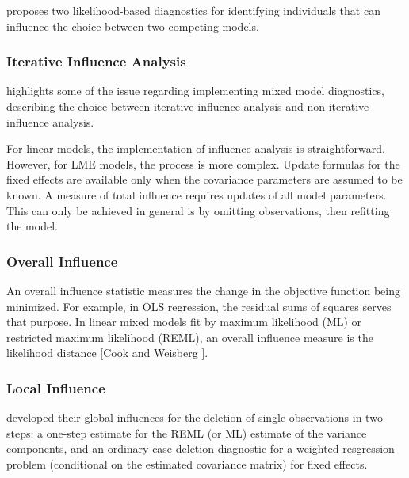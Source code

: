 \documentclass[12pt, a4paper]{report}
\theoremstyle{plain}
\theoremstyle{definition}
\theoremstyle{remark}
\begin{document}
	\citet{Demi} proposes two likelihood-based diagnostics for identifying individuals that can influence the choice between two competing models.
	
	
	
	\subsubsection{Iterative Influence Analysis}
	
	\citet{schabenberger} highlights some of the issue regarding implementing mixed model diagnostics, describing  the choice between  iterative influence analysis and  non-iterative influence analysis.
	
	For linear models, the implementation of influence analysis is straightforward. However, for LME models, the process is more complex. Update formulas for the fixed effects are available only when the covariance parameters are assumed to be known. A measure of total influence requires updates of all model parameters. This can only be achieved in general is by omitting observations, then refitting the model.
	
		\subsubsection{Overall Influence}
		An overall influence statistic measures the change in the objective function being minimized. For example, in
		OLS regression, the residual sums of squares serves that purpose. In linear mixed models fit by
		 maximum likelihood (ML) or  restricted maximum likelihood (REML), an overall influence measure is the  likelihood distance [Cook and Weisberg ].
		
	\subsubsection{Local Influence}

	

	
	\citet{Christensen} developed their global influences for the deletion of single observations in two steps: a one-step estimate for the REML (or ML) estimate of the variance components, and an ordinary case-deletion diagnostic for a weighted resgression problem (conditional on the estimated covariance matrix) for fixed effects.
	
\end{document}
